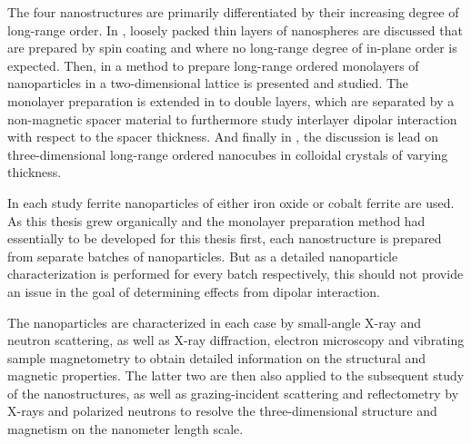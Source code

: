 \documentclass[\main/dresen_thesis.tex]{subfiles}
\begin{document}
    The four nanostructures are primarily differentiated by their increasing degree of long-range order.
    In , loosely packed thin layers of nanospheres are discussed that are prepared by spin coating and where no long-range degree of in-plane order is expected.
    Then, in  a method to prepare long-range ordered monolayers of nanoparticles in a two-dimensional lattice is presented and studied.
    The monolayer preparation is extended in  to double layers, which are separated by a non-magnetic spacer material to furthermore study interlayer dipolar interaction with respect to the spacer thickness.
    And finally in , the discussion is lead on three-dimensional long-range ordered nanocubes in colloidal crystals of varying thickness.

    In each study ferrite nanoparticles of either iron oxide or cobalt ferrite are used.
    As this thesis grew organically and the monolayer preparation method had essentially to be developed for this thesis first, each nanostructure is prepared from separate batches of nanoparticles.
    But as a detailed nanoparticle characterization is performed for every batch respectively, this should not provide an issue in the goal of determining effects from dipolar interaction.

    The nanoparticles are characterized in each case by small-angle X-ray and neutron scattering, as well as X-ray diffraction, electron microscopy and vibrating sample magnetometry to obtain detailed information on the structural and magnetic properties.
    The latter two are then also applied to the subsequent study of the nanostructures, as well as grazing-incident scattering and reflectometry by X-rays and polarized neutrons to resolve the three-dimensional structure and magnetism on the nanometer length scale.
\end{document}
